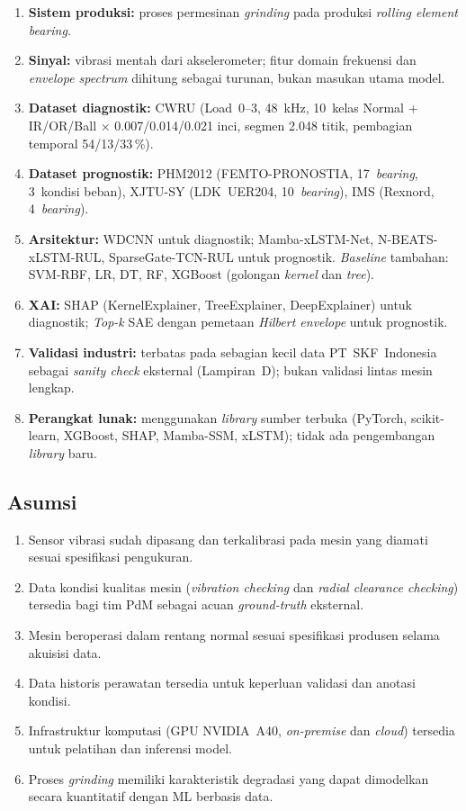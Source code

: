 \begin{enumerate}
  \item \textbf{Sistem produksi:} proses permesinan \emph{grinding}
        pada produksi \emph{rolling element bearing}.
  \item \textbf{Sinyal:} vibrasi mentah dari akselerometer; fitur
        domain frekuensi dan \emph{envelope spectrum} dihitung sebagai
        turunan, bukan masukan utama model.
  \item \textbf{Dataset diagnostik:} CWRU (Load~0–3, 48~kHz,
        10~kelas Normal + IR/OR/Ball × 0.007/0.014/0.021 inci,
        segmen 2.048 titik, pembagian temporal 54/13/33\,\%).
  \item \textbf{Dataset prognostik:} PHM2012 (FEMTO-PRONOSTIA,
        17~\emph{bearing}, 3~kondisi beban), XJTU-SY (LDK~UER204,
        10~\emph{bearing}), IMS (Rexnord, 4~\emph{bearing}).
  \item \textbf{Arsitektur:} WDCNN untuk diagnostik;
        Mamba-xLSTM-Net, N-BEATS-xLSTM-RUL, SparseGate-TCN-RUL
        untuk prognostik.
        \emph{Baseline} tambahan: SVM-RBF, LR, DT, RF, XGBoost
        (golongan \emph{kernel} dan \emph{tree}).
  \item \textbf{XAI:} SHAP (KernelExplainer, TreeExplainer,
        DeepExplainer) untuk diagnostik; \emph{Top-k} SAE dengan
        pemetaan \emph{Hilbert envelope} untuk prognostik.
  \item \textbf{Validasi industri:} terbatas pada sebagian kecil
        data PT~SKF~Indonesia sebagai \emph{sanity check} eksternal
        (Lampiran~D); bukan validasi lintas mesin lengkap.
  \item \textbf{Perangkat lunak:} menggunakan \emph{library} sumber
        terbuka (PyTorch, scikit-learn, XGBoost, SHAP, Mamba-SSM,
        xLSTM); tidak ada pengembangan \emph{library} baru.
\end{enumerate}

\subsection*{Asumsi}

\begin{enumerate}
  \item Sensor vibrasi sudah dipasang dan terkalibrasi pada mesin yang
        diamati sesuai spesifikasi pengukuran.
  \item Data kondisi kualitas mesin (\emph{vibration checking} dan
        \emph{radial clearance checking}) tersedia bagi tim PdM sebagai
        acuan \emph{ground-truth} eksternal.
  \item Mesin beroperasi dalam rentang normal sesuai spesifikasi
        produsen selama akuisisi data.
  \item Data historis perawatan tersedia untuk keperluan validasi dan
        anotasi kondisi.
  \item Infrastruktur komputasi (GPU NVIDIA~A40, \emph{on-premise}
        dan \emph{cloud}) tersedia untuk pelatihan dan inferensi model.
  \item Proses \emph{grinding} memiliki karakteristik degradasi yang
        dapat dimodelkan secara kuantitatif dengan ML berbasis data.
\end{enumerate}


